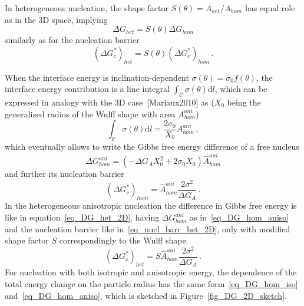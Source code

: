 In heterogeneous nucleation, the shape factor $S(\theta)=A_{het}/A_{hom}$ has equal role as in the 3D space, implying
\begin{equation}\label{eq_DG_het_2D}
	\Delta G_{het} = S(\theta)\Delta G_{hom}
\end{equation}
similarly as for the nucleation barrier
\begin{equation}\label{eq_nucl_barr_het_2D}
	(\Delta G_c^*)_{het} = S(\theta)(\Delta G_c^*)_{hom}\,.
\end{equation}

When the interface energy is inclination-dependent $\sigma(\theta)=\sigma_0 f(\theta)$, the interface energy contribution is a line integral $\int_\mathcal{C} \sigma(\theta) \mathrm{d}l$, which can be expressed in analogy with the 3D case~[Mariaux2010] as ($X_0$ being the generalized radius of the Wulff shape with area $A_{hom}^{ani}$)
\begin{equation}
	\int_\mathcal{C} \sigma(\theta) \mathrm{d}l = \frac{2\sigma_0}{X_0}A_{hom}^{ani} \,,    
\end{equation}
which eventually allows to write the Gibbs free energy difference of a free nucleus
\begin{equation}\label{eq_DG_hom_aniso}
	\Delta G_{hom}^{ani} = (-\Delta G_A X_0^2 + 2\sigma_0 X_0)\hat{A}_{hom}^{ani} 
\end{equation}
and further its nucleation barrier
\begin{equation} 
	(\Delta G_c^*)_{hom} = \hat{A}_{hom}^{ani}\frac{2\sigma^2}{\Delta G_A}\,.
\end{equation}
In the heterogeneous anisotropic nucleation the difference in Gibbs free energy is like in equation~\eqref{eq_DG_het_2D}, having $\Delta G_{hom}^{ani}$ as in~\eqref{eq_DG_hom_aniso} and the nucleation barrier like in~\eqref{eq_nucl_barr_het_2D}, only with modified shape factor $S$ correspondingly to the Wulff shape.
\begin{equation} \label{eq_DGcrit_het_aniso}
	(\Delta G_c^*)_{het} = S\hat{A}_{hom}^{ani}\frac{2\sigma^2}{\Delta G_A}\,.
\end{equation}
For nucleation with both isotropic and anisotropic energy, the dependence of the total energy change on the particle radius has the same form~\eqref{eq_DG_hom_iso} and~\eqref{eq_DG_hom_aniso}, which is sketched in Figure~\ref{fig_DG_2D_sketch}.

